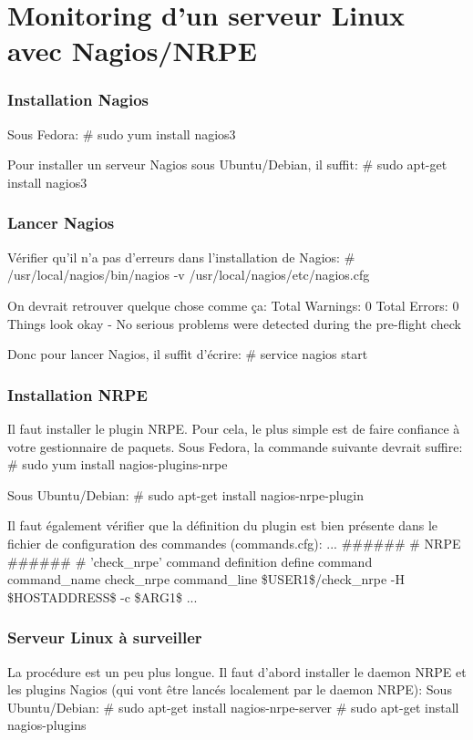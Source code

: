 \vfill \pagebreak
\part{Monitoring d'un serveur Linux avec Nagios/NRPE}

\section {Installation Nagios}
Sous Fedora:
# sudo yum install nagios3

Pour installer un serveur Nagios sous Ubuntu/Debian, il suffit:
# sudo apt-get install nagios3

\section {Lancer Nagios}
Vérifier qu'il n'a pas d'erreurs dans l'installation de Nagios:
# /usr/local/nagios/bin/nagios -v /usr/local/nagios/etc/nagios.cfg

On devrait retrouver quelque chose comme ça:
      Total Warnings: 0
      Total Errors:   0
      Things look okay - No serious problems were detected during the pre-flight check
      
Donc pour lancer Nagios, il suffit d'écrire:
# service nagios start

\section {Installation NRPE}
Il faut installer le plugin NRPE. Pour cela, le plus simple est de faire confiance à votre gestionnaire de paquets.
Sous Fedora, la commande suivante devrait suffire:
# sudo yum install nagios-plugins-nrpe

Sous Ubuntu/Debian:
# sudo apt-get install nagios-nrpe-plugin

Il faut également vérifier que la définition du plugin est bien présente dans le fichier de configuration des commandes (commands.cfg):
...
######
# NRPE
######
# 'check_nrpe' command definition
define command{
command_name check_nrpe
command_line \$USER1\$/check_nrpe -H \$HOSTADDRESS\$ -c \$ARG1\$
}
...


\section {Serveur Linux à surveiller}

La procédure est un peu plus longue. Il faut d'abord installer le daemon NRPE et les plugins Nagios (qui vont être lancés localement par le daemon NRPE):
Sous Ubuntu/Debian:
# sudo apt-get install nagios-nrpe-server
# sudo apt-get install nagios-plugins

